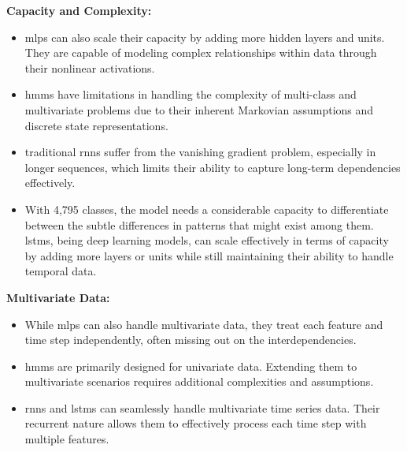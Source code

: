 \textbf{Capacity and Complexity:}
\begin{itemize}
    \item \acp{mlp} can also scale their capacity by adding more hidden layers and units. They are capable of modeling complex relationships within data through their nonlinear activations.
    \item \acp{hmm} have limitations in handling the complexity of multi-class and multivariate problems due to their inherent Markovian assumptions and discrete state representations.
    \item traditional \acp{rnn} suffer from the vanishing gradient problem, especially in longer sequences, which limits their ability to capture long-term dependencies effectively. \cite{rnn_difficulties_2013}
    \item With 4,795 classes, the model needs a considerable capacity to differentiate between the subtle differences in patterns that might exist among them. \acp{lstm}, being deep learning models, can scale effectively in terms of capacity by adding more layers or units while still maintaining their ability to handle temporal data.
\end{itemize}

\textbf{Multivariate Data:}
\begin{itemize}
    \item While \acp{mlp} can also handle multivariate data, they treat each feature and time step independently, often missing out on the interdependencies.
    \item \acp{hmm} are primarily designed for univariate data. Extending them to multivariate scenarios requires additional complexities and assumptions.
    \item \acp{rnn} and \acp{lstm} can seamlessly handle multivariate time series data. Their recurrent nature allows them to effectively process each time step with multiple features.
\end{itemize}

